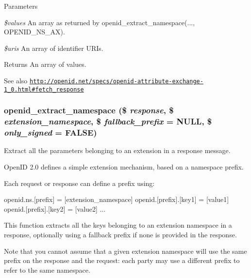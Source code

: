 \begin{DoxyParams}{Parameters}
\item[{\em \$values}]An array as returned by openid\_\-extract\_\-namespace(..., OPENID\_\-NS\_\-AX). \item[{\em \$uris}]An array of identifier URIs. \end{DoxyParams}
\begin{DoxyReturn}{Returns}
An array of values. 
\end{DoxyReturn}
\begin{DoxySeeAlso}{See also}
\href{http://openid.net/specs/openid-attribute-exchange-1_0.html#fetch_response}{\tt http://openid.net/specs/openid-\/attribute-\/exchange-\/1\_\-0.html\#fetch\_\-response} 
\end{DoxySeeAlso}
\hypertarget{openid_8inc_ace5c6d4c1e729d620d6a43273fac7fd6}{
\subsubsection[{openid\_\-extract\_\-namespace}]{\setlength{\rightskip}{0pt plus 5cm}openid\_\-extract\_\-namespace (\$ {\em response}, \/  \$ {\em extension\_\-namespace}, \/  \$ {\em fallback\_\-prefix} = {\ttfamily NULL}, \/  \$ {\em only\_\-signed} = {\ttfamily FALSE})}}
\label{openid_8inc_ace5c6d4c1e729d620d6a43273fac7fd6}
Extract all the parameters belonging to an extension in a response message.

OpenID 2.0 defines a simple extension mechanism, based on a namespace prefix.

Each request or response can define a prefix using: 
\begin{DoxyCode}
   openid.ns.[prefix] = [extension_namespace]
   openid.[prefix].[key1] = [value1]
   openid.[prefix].[key2] = [value2]
   ...
\end{DoxyCode}


This function extracts all the keys belonging to an extension namespace in a response, optionally using a fallback prefix if none is provided in the response.

Note that you cannot assume that a given extension namespace will use the same prefix on the response and the request: each party may use a different prefix to refer to the same namespace.


